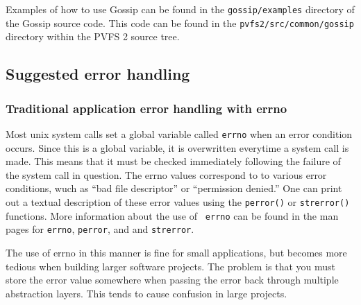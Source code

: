 \documentclass[11pt, letterpaper]{article}
\begin{document}
Examples of how to use Gossip can be found in the {\tt gossip/examples}
directory of the Gossip source code.  This code can be found in the
{\tt pvfs2/src/common/gossip} directory within the PVFS 2 source tree.

\subsection{Suggested error handling}

\subsubsection{Traditional application error handling with errno}

Most unix system calls set a global variable called {\tt errno} when an
error condition occurs.  Since this is a global variable, it is
overwritten everytime a system call is made.  This means that it must be
checked immediately following the failure of the system call in
question.  The errno values correspond to to various error conditions,
wuch as ``bad file descriptor'' or ``permission denied.''  One can print
out a textual description of these error values using the {\tt perror()}
or {\tt strerror()} functions.  More information about the use of {\tt
errno} can be found in the man pages for {\tt errno}, {\tt perror}, and
and {\tt strerror}.

The use of errno in this manner is fine for small applications, but
becomes more tedious when building larger software projects.  The
problem is that you must store the error value somewhere when passing
the error back through multiple abstraction layers.  This tends to cause
confusion in large projects.
\end{document}
